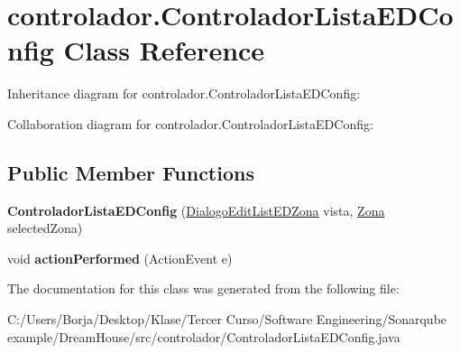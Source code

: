 \hypertarget{classcontrolador_1_1_controlador_lista_e_d_config}{}\section{controlador.\+Controlador\+Lista\+E\+D\+Config Class Reference}
\label{classcontrolador_1_1_controlador_lista_e_d_config}


Inheritance diagram for controlador.\+Controlador\+Lista\+E\+D\+Config\+:


Collaboration diagram for controlador.\+Controlador\+Lista\+E\+D\+Config\+:
\subsection*{Public Member Functions}
\begin{DoxyCompactItemize}
\item 
\mbox{\label{classcontrolador_1_1_controlador_lista_e_d_config_a041bd885847cb277021a95a25a08bc11}} 
{\bfseries Controlador\+Lista\+E\+D\+Config} (\mbox{\hyperlink{classvista_1_1_dialogo_edit_list_e_d_zona}{Dialogo\+Edit\+List\+E\+D\+Zona}} vista, \mbox{\hyperlink{classmodelo_1_1_zona}{Zona}} selected\+Zona)
\item 
\mbox{\label{classcontrolador_1_1_controlador_lista_e_d_config_aa409cf951eee8e6ffee0b092c2164684}} 
void {\bfseries action\+Performed} (Action\+Event e)
\end{DoxyCompactItemize}


The documentation for this class was generated from the following file\+:\begin{DoxyCompactItemize}
\item 
C\+:/\+Users/\+Borja/\+Desktop/\+Klase/\+Tercer Curso/\+Software Engineering/\+Sonarqube example/\+Dream\+House/src/controlador/Controlador\+Lista\+E\+D\+Config.\+java\end{DoxyCompactItemize}
